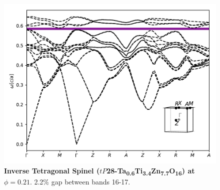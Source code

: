 \documentclass[fleqn,amsmath,amssymb,superscriptaddress, reprint,prl]{revtex4-1}
\begin{document}
\begin{figure}
\includegraphics[width=0.9\linewidth]{workspace/0cb1750d7f9de77c7c957fd5f43b6805/images/r=23.pdf}
	\caption{\textbf{Inverse Tetragonal Spinel ($tP$28-Ta\textsubscript{0}\textsubscript{.}\textsubscript{6}Ti\textsubscript{3}\textsubscript{.}\textsubscript{4}Zn\textsubscript{7}\textsubscript{.}\textsubscript{7}O\textsubscript{1}\textsubscript{6}) at $\phi=0.21$}. 2.2\% gap between bands 16-17.}
\end{figure}
\end{document}
